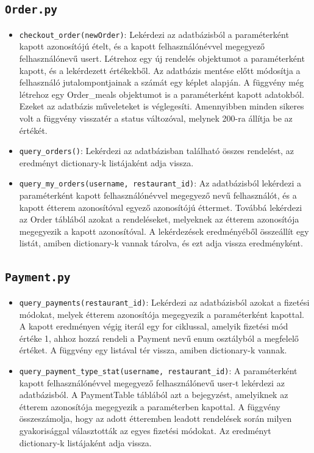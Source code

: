 \subsection{\texttt{Order.py}}

\begin{itemize}
\item \texttt{checkout\_order(newOrder)}:
Lekérdezi az adatbázisból a paraméterként kapott azonosítójú ételt, és a kapott felhasználónévvel megegyező felhasználónevű usert. Létrehoz egy új rendelés objektumot a paraméterként kapott, és a lekérdezett értékekből. Az adatbázis mentése előtt módosítja a felhasználó jutalompontjainak a számát egy képlet alapján. A függvény még létrehoz egy Order\_meals objektumot is a paraméterként kapott adatokból. Ezeket az adatbázis műveleteket is véglegesíti. Amennyibben minden sikeres volt a függvény visszatér a status változóval, melynek 200-ra állítja be az értékét.
\item \texttt{query\_orders()}:
Lekérdezi az adatbázisban található összes rendelést, az eredményt dictionary-k listájaként adja vissza.
\item \texttt{query\_my\_orders(username, restaurant\_id)}:
Az adatbázisból lekérdezi a paraméterként kapott felhasználónévvel megegyező nevű felhasználót, és a kapott étterem azonosítóval egyező azonosítójú éttermet. Továbbá lekérdezi az Order táblából azokat a rendeléseket, melyeknek az étterem azonosítója megegyezik a kapott azonosítóval. A lekérdezések eredményéből összeállít egy listát, amiben dictionary-k vannak tárolva, és ezt adja vissza eredményként.
\end{itemize}

\subsection{\texttt{Payment.py}}

\begin{itemize}
\item \texttt{query\_payments(restaurant\_id)}:
Lekérdezi az adatbázisból azokat a fizetési módokat, melyek étterem azonosítója megegyezik a paraméterként kapottal. A kapott eredményen végig iterál egy for ciklussal, amelyik fizetési mód értéke 1, ahhoz hozzá rendeli a Payment nevű enum osztályból a megfelelő értéket. A függvény egy listával tér vissza, amiben dictionary-k vannak.
\item \texttt{query\_payment\_type\_stat(username, restaurant\_id)}: 
A paraméterként kapott felhasználónévvel megegyező felhasználónevű user-t lekérdezi az adatbázisból. A PaymentTable táblából azt a bejegyzést, amelyiknek az étterem azonosítója megegyezik a paraméterben kapottal. A függvény összeszámolja, hogy az adott étteremben leadott rendelések során milyen gyakorisággal választották az egyes fizetési módokat. Az eredményt dictionary-k listájaként adja vissza.
\end{itemize}

